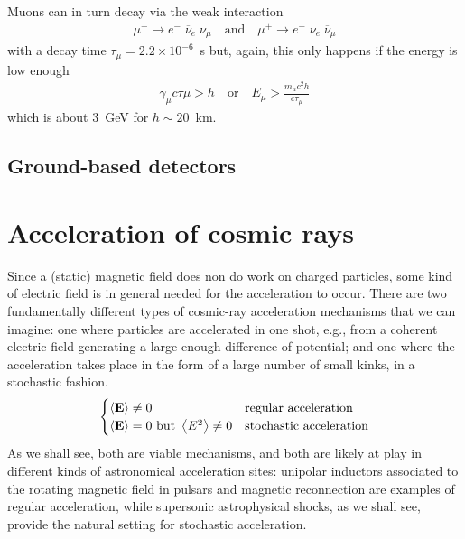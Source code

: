 Muons can in turn decay via the weak interaction
\begin{align*}
  \mu^- \rightarrow e^- \; \overline{\nu}_e \; \nu_\mu
  \quad\text{and}\quad
  \mu^+ \rightarrow e^+ \; \nu_e \; \overline{\nu}_\mu
\end{align*}
with a decay time $\tau_\mu = 2.2 \times 10^{-6}$~s but, again, this only happens
if the energy is low enough
\begin{align*}
  \gamma_\mu c \tau\mu > h
  \quad\text{or}\quad
  E_\mu > \frac{m_\mu c^2 h}{c\tau_\mu}
\end{align*}
which is about $3$~GeV for $h \sim 20$~km.


\subsection{Ground-based detectors}



\section{Acceleration of cosmic rays}

Since a (static) magnetic field does non do work on charged particles, some kind of
electric field is in general needed for the acceleration to occur. There are two
fundamentally different types of cosmic-ray acceleration mechanisms that we can
imagine: one where particles are accelerated in one shot, e.g., from a coherent
electric field generating a large enough difference of potential; and one where
the acceleration takes place in the form of a large number of small kinks, in a
stochastic fashion.
\begin{align*}
  \begin{cases}
    \left<\vb{E}\right> \neq 0 & \text{regular acceleration}\\
  \left<\vb{E}\right> = 0~\text{but}~\left<E^2\right> \neq 0 & \text{stochastic acceleration}
  \end{cases}
\end{align*}
As we shall see, both are viable mechanisms, and both are likely at play in different
kinds of astronomical acceleration sites: unipolar inductors associated to the
rotating magnetic field in pulsars and magnetic reconnection are examples of regular
acceleration, while supersonic astrophysical shocks, as we shall
see, provide the natural setting for stochastic acceleration.

